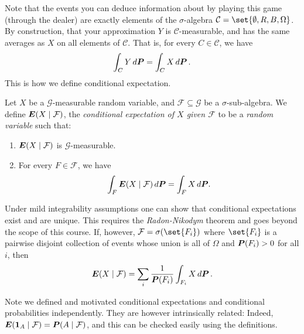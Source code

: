 Note that the events you can deduce information about by playing this game (through the dealer) are exactly elements of the $\sigma$-algebra $\mathcal C = \set{\emptyset, R, B, \Omega}$.
By construction, that your approximation $Y$ is $\mathcal C$-measurable, and has the same averages as $X$ on all elements of $\mathcal C$.
That is, for every $C \in \mathcal C$, we have
\begin{equation*}
  \int_C Y \, d\P = \int_C X \, d\P \,.
\end{equation*}
This is how we define conditional expectation.

\begin{definition}
  Let $X$ be a $\mathcal G$-measurable random variable, and $\mathcal F \subseteq \mathcal G$ be a $\sigma$-sub-algebra.
  We define $\E(X \given \mathcal F)$, the \emph{conditional expectation of $X$ given $\mathcal F$} to be a \emph{random variable} such that:
  \begin{enumerate}
    \item
      $\E( X \given \mathcal F)$ is $\mathcal G$-measurable.

    \item
      For every $F \in \mathcal F$, we have
      \begin{equation*}
	\int_F \E(X \given \mathcal F) \, d\P = \int_F X \, d\P.
      \end{equation*}
  \end{enumerate}
\end{definition}

\begin{remark}
  Under mild integrability assumptions one can show that conditional expectations exist and are unique.
  This requires the \emph{Radon-Nikodym} theorem and goes beyond the scope of this course.
  If, however, $\mathcal F = \sigma( \set{F_i} )$ where $\set{F_i}$ is a pairwise disjoint collection of events whose union is all of $\Omega$ and $\P(F_i) > 0 $ for all $i$, then
  \begin{equation*}
    \E( X \given \mathcal F)
      = \sum_i \frac{1}{\P(F_i)} \int_{F_i} X \, d\P \,.
  \end{equation*}
\end{remark}

\begin{remark}
  Note we defined and motivated conditional expectations and conditional probabilities independently.
  They are however intrinsically related:
  Indeed, $\E( \one_A \given \mathcal F) = \P( A \given \mathcal F)$, and this can be checked easily using the definitions.
\end{remark}


